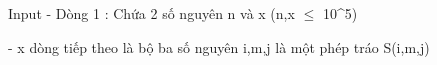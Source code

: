 Input
- Dòng 1 : Chứa 2 số nguyên n và x (n,x  $\le$  10^5)  

   - x dòng tiếp theo là bộ ba số nguyên i,m,j là một phép tráo S(i,m,j)